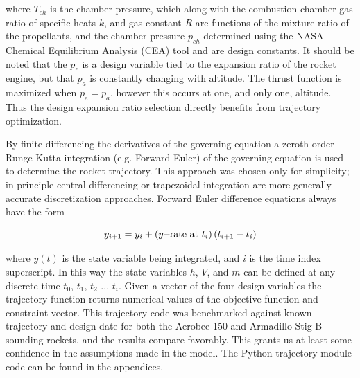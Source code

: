 \documentclass[]{aiaa-tc}%
\begin{document}
where $T_{ch}$ is the chamber pressure, which along with the combustion chamber gas ratio of specific heats $k$, and gas constant $R$ are functions of the mixture ratio of the propellants, and the chamber pressure $p_{ch}$ determined using the NASA Chemical Equilibrium Analysis (CEA)\cite{CEA} tool and are design constants. It should be noted that the $p_e$ is a design variable tied to the expansion ratio of the rocket engine, but that $p_a$ is constantly changing with altitude. The thrust function is maximized when $p_e = p_a$, however this occurs at one, and only one, altitude. Thus the design expansion ratio selection directly benefits from trajectory optimization.

By finite-differencing the derivatives of the governing equation a zeroth-order Runge-Kutta integration (e.g. Forward Euler) of the governing equation is used to determine the rocket trajectory. This approach was chosen only for simplicity; in principle central differencing or trapezoidal integration are more generally accurate discretization approaches. Forward Euler difference equations always have the form

\[y_{i+1} = y_i + \left(y\hspace{-1 mm}-\hspace{-1 mm}\mbox{rate at } t_i \right)(t_{i+1} - t_i) \]

where $y(t)$ is the state variable being integrated, and $i$ is the time index superscript. In this way the state variables $h$, $V$, and $m$ can be defined at any discrete time $t_0$, $t_1$, $t_2$ ... $t_i$. Given a vector of the four design variables the trajectory function returns numerical values of the objective function and constraint vector. This trajectory code was benchmarked against known trajectory and design date for both the Aerobee-150 and Armadillo Stig-B sounding rockets, and the results compare favorably. This grants us at least some confidence in the assumptions made in the model. The Python trajectory module code can be found in the appendices.
\end{document}
